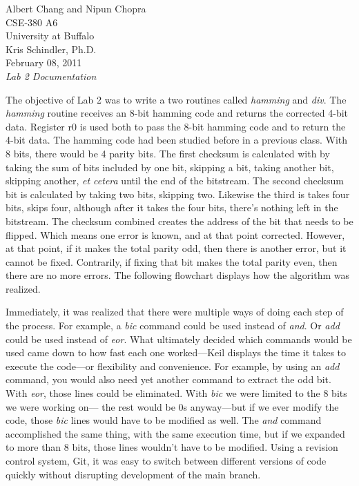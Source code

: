 \documentclass[letterpaper,10pt]{article}
\begin{document}
    Albert Chang and Nipun Chopra\\
    CSE-380 A6\\
    University at Buffalo\\
    Kris Schindler, Ph.D.\\
    February 08, 2011\\
    \textit{Lab 2 Documentation}

    The objective of Lab 2 was to write a two routines called \textit{hamming}
    and \textit{div}. The \textit{hamming} routine receives an 8-bit hamming
    code and returns the corrected 4-bit data. Register r0 is used both to
    pass the 8-bit hamming code and to return the 4-bit data. The hamming
    code had been studied before in a previous class. With 8 bits, there would
    be 4 parity bits. The first checksum is calculated with by taking the
    sum of bits included by one bit, skipping a bit, taking another bit,
    skipping another, \textit{et cetera} until the end of the bitstream. The
    second checksum bit is calculated by taking two bits, skipping two.
    Likewise the third is takes four bits, skips four, although after it takes
    the four bits, there's nothing left in the bitstream. The checksum combined
    creates the address of the bit that needs to be flipped. Which means one
    error is known, and at that point corrected. However, at that point, if
    it makes the total parity odd, then there is another error, but it cannot
    be fixed. Contrarily, if fixing that bit makes the total parity even, then
    there are no more errors. The following flowchart displays how the
    algorithm was realized.

    Immediately, it was realized that there were multiple ways of doing each
    step of the process. For example, a \textit{bic} command could be used
    instead of \textit{and}. Or \textit{add} could be used instead of
    \textit{eor}. What ultimately decided which commands would be used came
    down to how fast each one worked---Keil displays the time it takes to
    execute the code---or flexibility and convenience. For example, by
    using an \textit{add} command, you would also need yet another command to
    extract the odd bit. With \textit{eor}, those lines could be eliminated.
    With \textit{bic} we were limited to the 8 bits we were working on---
    the rest would be 0s anyway---but if we ever modify the code, those
    \textit{bic} lines would have to be modified as well. The \textit{and}
    command accomplished the same thing, with the same execution time, but if
    we expanded to more than 8 bits, those lines wouldn't have to be modified.
    Using a revision control system, Git, it was easy to switch between
    different versions of code quickly without disrupting development of the
    main branch.
\end{document}
